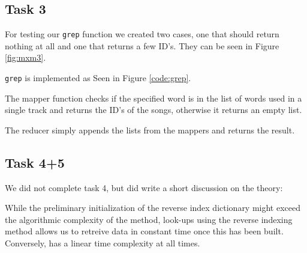 \subsection{Task 3}
For testing our \texttt{grep} function we created two cases, one that should
return nothing at all and one that returns a few ID's. They can be seen in
Figure \ref{fig:mxm3}.


\texttt{grep} is implemented as Seen in Figure \ref{code:grep}.




The mapper function checks if the specified word is in the list of words used in
a single track and returns the ID's of the songs, otherwise it returns an empty
list.

The reducer simply appends the lists from the mappers and returns the result.

\subsection{Task 4+5}
We did not complete task 4, but did write a short discussion on the theory:


While the preliminary initialization of the reverse index dictionary might
exceed the algorithmic complexity of the  method, look-ups using
the reverse indexing method allows us to retreive data in constant time once
this has been built. Conversely,  has a linear time complexity at
all times.

